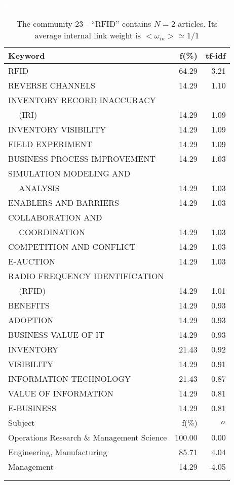 \documentclass[a4paper,11pt]{report}
\begin{document}
\begin{landscape}
\begin{table}[!ht]
\caption{The community 23 - ``RFID'' contains $N = 2$ articles. Its average internal link weight is $<\omega_{in}> \simeq 1/1$ }
\textcolor{white}{aa}\\
{\scriptsize\begin{tabular}{|l r  r|}
\hline
Keyword & f(\%) & tf-idf \\
\hline
RFID & 64.29 & 3.21\\
REVERSE CHANNELS & 14.29 & 1.10\\
INVENTORY RECORD INACCURACY &  &\\
$\quad$ (IRI) & 14.29 & 1.09\\
INVENTORY VISIBILITY & 14.29 & 1.09\\
FIELD EXPERIMENT & 14.29 & 1.09\\
BUSINESS PROCESS IMPROVEMENT & 14.29 & 1.03\\
SIMULATION MODELING AND &  &\\
$\quad$ ANALYSIS & 14.29 & 1.03\\
ENABLERS AND BARRIERS & 14.29 & 1.03\\
COLLABORATION AND &  &\\
$\quad$ COORDINATION & 14.29 & 1.03\\
COMPETITION AND CONFLICT & 14.29 & 1.03\\
E-AUCTION & 14.29 & 1.03\\
RADIO FREQUENCY IDENTIFICATION &  &\\
$\quad$ (RFID) & 14.29 & 1.01\\
BENEFITS & 14.29 & 0.93\\
ADOPTION & 14.29 & 0.93\\
BUSINESS VALUE OF IT & 14.29 & 0.93\\
INVENTORY & 21.43 & 0.92\\
VISIBILITY & 14.29 & 0.91\\
INFORMATION TECHNOLOGY & 21.43 & 0.87\\
VALUE OF INFORMATION & 14.29 & 0.81\\
E-BUSINESS & 14.29 & 0.81\\
\hline
\hline
Subject & f(\%) & $\sigma$\\
\hline
Operations Research \& Management Science & 100.00 & 0.00\\
Engineering, Manufacturing & 85.71 & 4.04\\
Management & 14.29 & -4.05\\
 &  & \\
 &  & \\

\end{tabular}}
\end{table}
\end{landscape}
\end{document}
